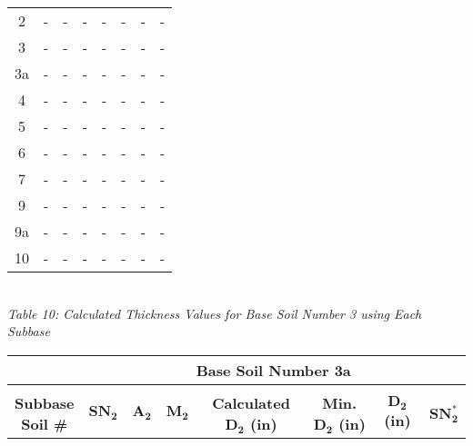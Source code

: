 \documentclass{article}
\begin{document}
\begin{center}
\begin{spacing}{1.6}
\begin{tabular}{|c|ccccccc|}
                                            2       & -     & -    & -    & -                    & -              & -         & -       \\
                                            3       & -     & -    & -    & -                    & -              & -         & -       \\
                                            3a      & -     & -    & -    & -                    & -              & -         & -       \\
                                            4       & -     & -    & -    & -                    & -              & -         & -       \\
                                            5       & -     & -    & -    & -                    & -              & -         & -       \\
                                            6       & -     & -    & -    & -                    & -              & -         & -       \\
                                            7       & -     & -    & -    & -                    & -              & -         & -       \\
                                            9       & -     & -    & -    & -                    & -              & -         & -       \\
                                            9a      & -     & -    & -    & -                    & -              & -         & -       \\
                                            10      & -     & -    & -    & -                    & -              & -         & -       \\\hline
        \end{tabular}
        \vspace{3mm}
        \emph{\\Table 10: Calculated Thickness Values for Base Soil Number 3 using Each Subbase}
        \newpage
        \begin{tabular}{|c|ccccccc|}
            \hline    
            \multicolumn{1}{|l}{}                     & \multicolumn{7}{c|}{\textbf{Base Soil Number 3a}}                                              \\\hline
            &&&&&&&\\
             \shortstack[c]{\textbf{Subbase}\\\textbf{Soil \#}} & $\bm{SN_2}$ & $\bm{A_2}$ & $\bm{M_2}$ & \textbf{Calculated $\bm{D_2}$ (in)} & \textbf{Min. $\bm{D_2}$ (in)} & \textbf{$\bm{D_2}$ (in)} & $\bm{SN_2^*}$  \\\hline

\end{tabular}
\end{spacing}
\end{center}
\end{document}
